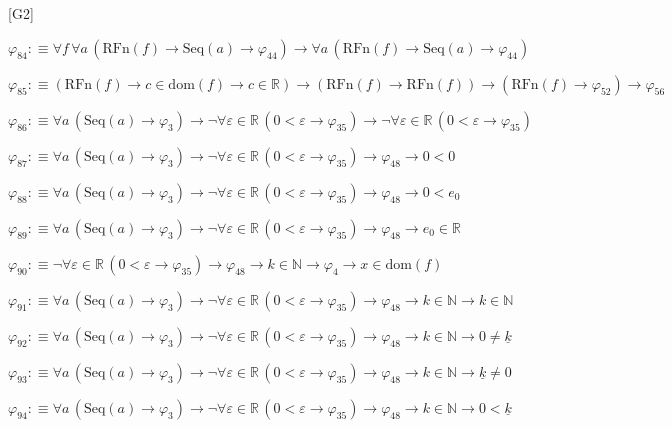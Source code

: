\begin{fullproof}{[G2]}
\begin{abbrevlist}
\item $\varphi_{84} :\equiv \forall f\,\forall a\,(\mathrm{RFn}(f) \to \mathrm{Seq}(a) \to \varphi_{44}) \to \forall a\,(\mathrm{RFn}(f) \to \mathrm{Seq}(a) \to \varphi_{44})$
\item $\varphi_{85} :\equiv (\mathrm{RFn}(f) \to c \in \mathrm{dom}(f) \to c \in \mathbb{R}) \to (\mathrm{RFn}(f) \to \mathrm{RFn}(f)) \to (\mathrm{RFn}(f) \to \varphi_{52}) \to \varphi_{56}$
\item $\varphi_{86} :\equiv \forall a\,(\mathrm{Seq}(a) \to \varphi_{3}) \to \neg \forall \varepsilon \in \mathbb{R}\,(0 < \varepsilon \to \varphi_{35}) \to \neg \forall \varepsilon \in \mathbb{R}\,(0 < \varepsilon \to \varphi_{35})$
\item $\varphi_{87} :\equiv \forall a\,(\mathrm{Seq}(a) \to \varphi_{3}) \to \neg \forall \varepsilon \in \mathbb{R}\,(0 < \varepsilon \to \varphi_{35}) \to \varphi_{48} \to 0 < 0$
\item $\varphi_{88} :\equiv \forall a\,(\mathrm{Seq}(a) \to \varphi_{3}) \to \neg \forall \varepsilon \in \mathbb{R}\,(0 < \varepsilon \to \varphi_{35}) \to \varphi_{48} \to 0 < e_{0}$
\item $\varphi_{89} :\equiv \forall a\,(\mathrm{Seq}(a) \to \varphi_{3}) \to \neg \forall \varepsilon \in \mathbb{R}\,(0 < \varepsilon \to \varphi_{35}) \to \varphi_{48} \to e_{0} \in \mathbb{R}$
\item $\varphi_{90} :\equiv \neg \forall \varepsilon \in \mathbb{R}\,(0 < \varepsilon \to \varphi_{35}) \to \varphi_{48} \to k \in \mathbb{N} \to \varphi_{4} \to x \in \mathrm{dom}(f)$
\item $\varphi_{91} :\equiv \forall a\,(\mathrm{Seq}(a) \to \varphi_{3}) \to \neg \forall \varepsilon \in \mathbb{R}\,(0 < \varepsilon \to \varphi_{35}) \to \varphi_{48} \to k \in \mathbb{N} \to k \in \mathbb{N}$
\item $\varphi_{92} :\equiv \forall a\,(\mathrm{Seq}(a) \to \varphi_{3}) \to \neg \forall \varepsilon \in \mathbb{R}\,(0 < \varepsilon \to \varphi_{35}) \to \varphi_{48} \to k \in \mathbb{N} \to 0 \neq \underline{k}$
\item $\varphi_{93} :\equiv \forall a\,(\mathrm{Seq}(a) \to \varphi_{3}) \to \neg \forall \varepsilon \in \mathbb{R}\,(0 < \varepsilon \to \varphi_{35}) \to \varphi_{48} \to k \in \mathbb{N} \to \underline{k} \neq 0$
\item $\varphi_{94} :\equiv \forall a\,(\mathrm{Seq}(a) \to \varphi_{3}) \to \neg \forall \varepsilon \in \mathbb{R}\,(0 < \varepsilon \to \varphi_{35}) \to \varphi_{48} \to k \in \mathbb{N} \to 0 < \underline{k}$

\end{abbrevlist}
\end{fullproof}

